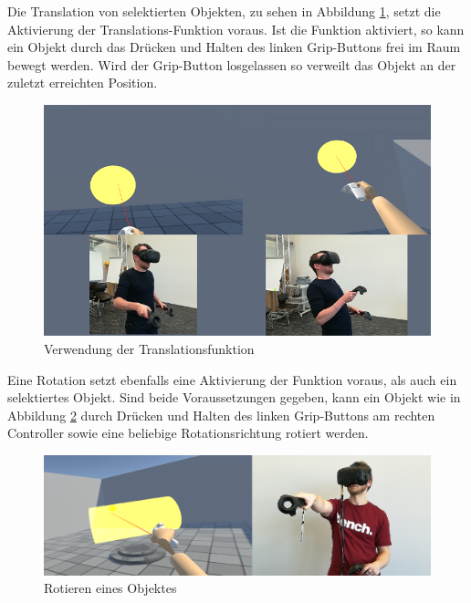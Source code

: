 \noindent Die Translation von selektierten Objekten, zu sehen in Abbildung \ref{fig:translation}, setzt die Aktivierung der Translations-Funktion voraus. Ist die Funktion aktiviert, so kann ein Objekt durch das Drücken und Halten des linken Grip-Buttons frei im Raum bewegt werden. Wird der Grip-Button losgelassen so verweilt das Objekt an der zuletzt erreichten Position.

\begin{figure}[h]
\captionsetup{width=.7\linewidth}
\includegraphics[scale=0.6]{Bilder/Hauptteil/Bearbeitet/TranslationMerge}
\centering
\caption{Verwendung der Translationsfunktion}
\label{fig:translation}
\end{figure}

\noindent Eine Rotation setzt ebenfalls eine Aktivierung der Funktion voraus, als auch ein selektiertes Objekt. Sind beide Voraussetzungen gegeben, kann ein Objekt wie in Abbildung \ref{fig:rotation} durch Drücken und Halten des linken Grip-Buttons am rechten Controller sowie eine beliebige Rotationsrichtung rotiert werden.

\begin{figure}[h]
\captionsetup{width=.7\linewidth}
\includegraphics[scale=0.35]{Bilder/Hauptteil/Bearbeitet/RotationMerge}
\centering
\caption{Rotieren eines Objektes}
\label{fig:rotation}
\end{figure}

